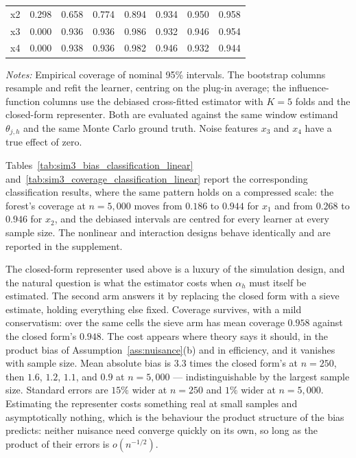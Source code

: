 \documentclass[12pt]{article}
\begin{document}
\begin{table}[htbp]
\begin{threeparttable}
\begin{tabular}{lrrrrrrr}
				\quad x2 & 0.298 & 0.658 & 0.774 & 0.894 & 0.934 & 0.950 & 0.958 \\
				\quad x3 & 0.000 & 0.936 & 0.936 & 0.986 & 0.932 & 0.946 & 0.954 \\
				\quad x4 & 0.000 & 0.938 & 0.936 & 0.982 & 0.946 & 0.932 & 0.944 \\
				\bottomrule
				\end{tabular}
				\begin{tablenotes}
				\footnotesize
				\item \textit{Notes:} Empirical coverage of nominal 95\% intervals. The bootstrap columns resample and refit the learner, centring on the plug-in average; the influence-function columns use the debiased cross-fitted estimator with $K=5$ folds and the closed-form representer. Both are evaluated against the same window estimand $\theta_{j,h}$ and the same Monte Carlo ground truth. Noise features $x_3$ and $x_4$ have a true effect of zero.
				\end{tablenotes}
		\end{threeparttable}
	\end{table}
	
	Tables~\ref{tab:sim3_bias_classification_linear} and~\ref{tab:sim3_coverage_classification_linear} report the corresponding classification results, where the same pattern holds on a compressed scale: the forest's coverage at $n=5{,}000$ moves from $0.186$ to $0.944$ for $x_1$ and from $0.268$ to $0.946$ for $x_2$, and the debiased intervals are centred for every learner at every sample size. The nonlinear and interaction designs behave identically and are reported in the supplement.
	
	The closed-form representer used above is a luxury of the simulation design, and the natural question is what the estimator costs when $\alpha_h$ must itself be estimated. The second arm answers it by replacing the closed form with a sieve estimate, holding everything else fixed. Coverage survives, with a mild conservatism: over the same cells the sieve arm has mean coverage $0.958$ against the closed form's $0.948$. The cost appears where theory says it should, in the product bias of Assumption~\ref{ass:nuisance}(b) and in efficiency, and it vanishes with sample size. Mean absolute bias is $3.3$ times the closed form's at $n=250$, then $1.6$, $1.2$, $1.1$, and $0.9$ at $n=5{,}000$ --- indistinguishable by the largest sample size. Standard errors are $15\%$ wider at $n=250$ and $1\%$ wider at $n=5{,}000$. Estimating the representer costs something real at small samples and asymptotically nothing, which is the behaviour the product structure of the bias predicts: neither nuisance need converge quickly on its own, so long as the product of their errors is $o(n^{-1/2})$.
	
\end{document}
